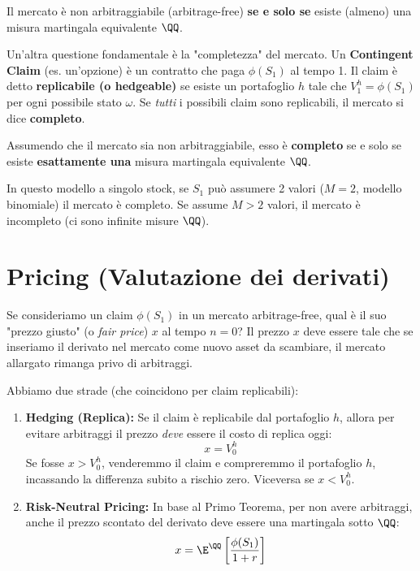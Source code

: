 \begin{theorem}
Il mercato è non arbitraggiabile (arbitrage-free) \textbf{se e solo se} esiste (almeno) una misura martingala equivalente $\QQ$.
\end{theorem}

Un'altra questione fondamentale è la "completezza" del mercato. Un \textbf{Contingent Claim} (es. un'opzione) è un contratto che paga $\phi(S_1)$ al tempo 1. Il claim è detto \textbf{replicabile (o hedgeable)} se esiste un portafoglio $h$ tale che $V_1^h = \phi(S_1)$ per ogni possibile stato $\omega$. 
Se \emph{tutti} i possibili claim sono replicabili, il mercato si dice \textbf{completo}.

\begin{theorem}
Assumendo che il mercato sia non arbitraggiabile, esso è \textbf{completo} se e solo se esiste \textbf{esattamente una} misura martingala equivalente $\QQ$.
\end{theorem}

In questo modello a singolo stock, se $S_1$ può assumere 2 valori ($M=2$, modello binomiale) il mercato è completo. Se assume $M > 2$ valori, il mercato è incompleto (ci sono infinite misure $\QQ$).

\section{Pricing (Valutazione dei derivati)}

Se consideriamo un claim $\phi(S_1)$ in un mercato arbitrage-free, qual è il suo "prezzo giusto" (o \textit{fair price}) $x$ al tempo $n=0$?
Il prezzo $x$ deve essere tale che se inseriamo il derivato nel mercato come nuovo asset da scambiare, il mercato allargato rimanga privo di arbitraggi.

Abbiamo due strade (che coincidono per claim replicabili):
\begin{enumerate}
    \item \textbf{Hedging (Replica):} Se il claim è replicabile dal portafoglio $h$, allora per evitare arbitraggi il prezzo \emph{deve} essere il costo di replica oggi:
    \[ x = V_0^h \]
    Se fosse $x > V_0^h$, venderemmo il claim e compreremmo il portafoglio $h$, incassando la differenza subito a rischio zero. Viceversa se $x < V_0^h$.
    \item \textbf{Risk-Neutral Pricing:} In base al Primo Teorema, per non avere arbitraggi, anche il prezzo scontato del derivato deve essere una martingala sotto $\QQ$:
    \[ x = \E^\QQ\left[ \frac{\phi(S_1)}{1+r} \right] \]
\end{enumerate}

